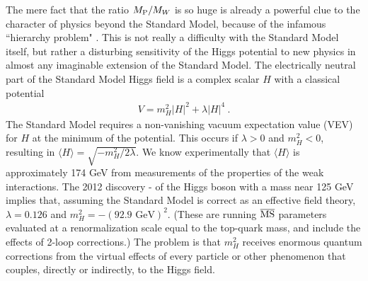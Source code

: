 \documentclass[11pt]{article}
\def\beq{\begin{eqnarray}}
\def\eeq{\end{eqnarray}}
\def\msbar{\overline{\rm MS}}
\def\MPlanck{M_{\rm P}}
\begin{document}
The mere fact that the ratio $\MPlanck/M_W$ is so huge is already a
powerful clue to the character of physics beyond the Standard Model,
because of the infamous ``hierarchy problem" \cite{hierarchyproblem}. This
is not really a difficulty with the Standard Model itself, but rather a
disturbing sensitivity of the Higgs potential to new physics in almost any
imaginable extension of the Standard Model. The electrically neutral part
of the Standard Model Higgs field is a complex scalar $H$ with a classical
potential
\beq
V = m_H^2 |H|^2 + {\lambda} |H|^4\> .
\label{higgspotential}
\eeq
The Standard Model requires a non-vanishing vacuum expectation value (VEV)
for $H$ at the minimum of the potential. This occurs if $\lambda > 0$
and $m_H^2 < 0$, resulting in $\langle H \rangle =
\sqrt{-m_H^2/2\lambda}$. 
We know experimentally that $\langle H \rangle$ is approximately 174 GeV 
from measurements of the properties of
the weak interactions. 
The 2012 discovery 
\cite{Higgsdiscovery}-\cite{Higgsmass} 
of the Higgs boson with a mass
near 125 GeV implies that, assuming the Standard Model is correct as an 
effective field theory, $\lambda = 0.126$ and $m_H^2 = -(\mbox{92.9 GeV})^2$. 
(These are running $\msbar$ parameters evaluated at a renormalization scale 
equal to the top-quark mass, and include the effects of 2-loop corrections.)
The problem is that $m_H^2$ receives enormous quantum
corrections from the virtual effects of every particle or other phenomenon
that couples, directly or indirectly, to the Higgs field. 
\end{document}
